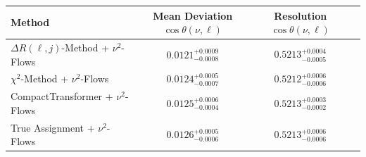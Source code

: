     \begin{tabular}{lccc}
        \toprule
        Method & Mean Deviation $\cos\theta(\nu, \ell)$ & Resolution $\cos\theta(\nu, \ell)$ \\
        \midrule
        $\Delta R(\ell,j)$-Method + $\nu^2$-Flows & $0.0121^{+0.0009}_{-0.0008}$ & $0.5213^{+0.0004}_{-0.0005}$ \\
        $\chi^2$-Method + $\nu^2$-Flows & $0.0124^{+0.0005}_{-0.0007}$ & $0.5212^{+0.0006}_{-0.0006}$ \\
        CompactTransformer + $\nu^2$-Flows & $0.0125^{+0.0006}_{-0.0004}$ & $0.5213^{+0.0003}_{-0.0002}$ \\
        True Assignment + $\nu^2$-Flows & $0.0126^{+0.0005}_{-0.0006}$ & $0.5213^{+0.0006}_{-0.0006}$ \\
        \bottomrule
    \end{tabular}